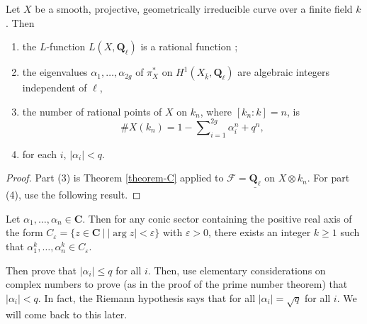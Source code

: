 \begin{lemma}
\label{lemma-count-points-projective}
Let $X$ be a smooth, projective, geometrically irreducible
curve over a finite field $k$. Then
\begin{enumerate}
\item the $L$-function $L(X, \mathbf{Q}_\ell)$ is a rational function ;
\item the eigenvalues $\alpha_1, \ldots, \alpha_{2g}$ of $\pi_X^*$ on
$H^1(X_{\bar k}, \mathbf{Q}_\ell)$ are algebraic integers
independent of $\ell$,
\item the number of rational points of $X$ on $k_n$, where $[k_n: k] = n$, is
$$
\# X(k_n) = 1 - \sum\nolimits_{i=1}^{2g}\alpha_i^n + q^n,
$$
\item for each $i$, $|\alpha_i| < q$.
\end{enumerate}
\end{lemma}

\begin{proof}
Part (3) is Theorem \ref{theorem-C} applied to $\mathcal{F} =
\underline{\mathbf{Q}_\ell}$ on $X \otimes k_n$. For part (4), use the
following result.
\end{proof}

\begin{exercise}
\label{exercise-powers}
Let $\alpha_1, \dots, \alpha_n \in \mathbf{C}$. Then for any conic sector
containing the positive real axis of the form $C_\varepsilon = \{ z \in
\mathbf{C} \ | \ |\arg z| < \varepsilon \}$ with $\varepsilon >0$, there exists
an integer $k \geq 1$ such that $\alpha_1^k, \dots, \alpha_n^k \in
C_\varepsilon$.
\end{exercise}

\noindent
Then prove that $|\alpha_i| \leq q$ for all $i$. Then, use elementary
considerations on complex numbers to prove (as in the proof of the prime number
theorem) that $|\alpha_i| < q$. In fact, the Riemann hypothesis says that for
all $|\alpha_i| = \sqrt q$ for all $i$. We will come back to this later.

